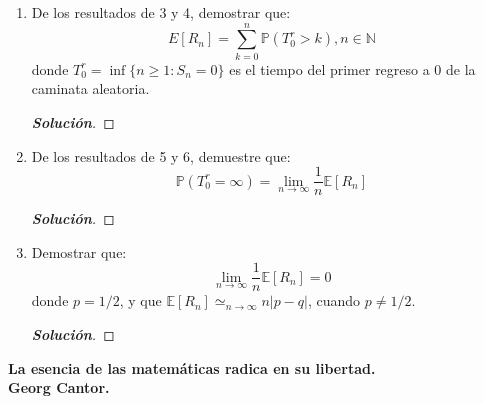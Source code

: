 \documentclass[12pt, letterpaper]{article}
\newcommand{\p}{\mathbb{P}}
\newenvironment{manualtheorem}[1]{%
  \renewcommand\themanualtheoreminner{#1}%
  \manualtheoreminner
}{\endmanualtheoreminner}
\newenvironment{solucion}
  {\renewcommand\qedsymbol{$\square$}\begin{proof}[\textbf{Solución}]}
  {\end{proof}}
\begin{document}
\begin{manualtheorem}{4.2}
\begin{enumerate}
        \item De los resultados de 3 y 4, demostrar que:
        $$E[R_n]=\sum^{n}_{k=0}\p(T^{r}_{0}>k), n\in \mathbb{N} $$
        donde $T^{r}_{0}=\inf \{ n\geq 1:S_n=0\}$ es el tiempo del primer regreso a 0 de la caminata aleatoria.
        \begin{solucion}
        \end{solucion}
        
        \item De los resultados de 5 y 6, demuestre que:
        $$\p(T^{r}_{0}=\infty)=\lim_{n\rightarrow\infty}\frac{1}{n}\mathbb{E}[R_n]$$
        \begin{solucion}
        \end{solucion}
        
        \item Demostrar que:
        $$ {\lim_{n\rightarrow\infty}\frac{1}{n}\mathbb{E}[R_n]=0}$$ donde $p=1/2$, y que $\mathbb{E}[R_n]\simeq_{n\rightarrow \infty} n|p-q|$, cuando $p\neq1/2$.
        \begin{solucion}
        \end{solucion}
    \end{enumerate}
    \end{manualtheorem}
    \begin{center}
        {\small  \bfseries La esencia de las matemáticas radica en su libertad. \\Georg Cantor.}
    \end{center}
\end{document}
